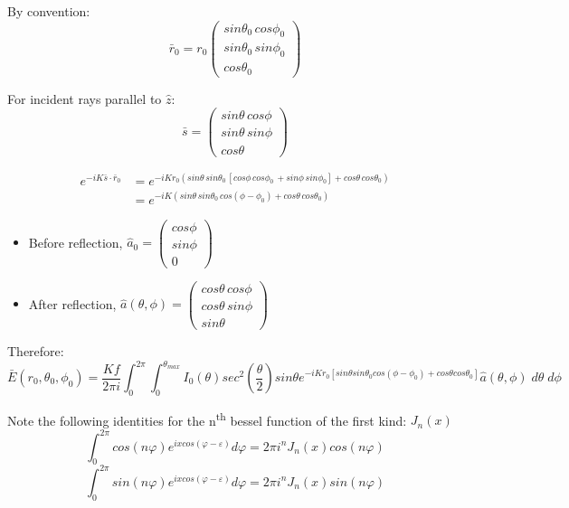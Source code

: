\documentclass{article}
\begin{document}
    By convention: \[ \bar{r}_0 = r_0 \begin{pmatrix} sin\theta_0 \, cos\phi_0 \\ sin\theta_0 \, sin\phi_0 \\ cos\theta_0\end{pmatrix}\]

    For incident rays parallel to \(\hat{z}\): \[\bar{s} = \begin{pmatrix} sin\theta \, cos\phi \\ sin\theta \, sin\phi \\ cos\theta\end{pmatrix} \]

    \begin{align*}
    e^{-iK\bar{s}\cdot\bar{r}_0} & = e^{-i K r_0 (sin\theta \, sin\theta_0 \, [cos\phi\, cos\phi_0\, + sin\phi\, sin\phi_0] + cos\theta\, cos\theta_0)}\\ & = e^{-iK(sin\theta\, sin\theta_0\,cos(\phi-\phi_0)+cos\theta\,cos\theta_0)}
    \end{align*}
    \begin{itemize}
        \item Before reflection, \(\hat{a}_0 = \begin{pmatrix} cos\phi \\ sin\phi \\ 0 \end{pmatrix}\)
        \item After reflection, \(\hat{a}(\theta,\phi) = \begin{pmatrix} cos\theta\, cos\phi \\ cos\theta\, sin\phi \\ sin\theta \end{pmatrix}\)
    \end{itemize}
    
    Therefore:
    \[\bar{E}(r_0, \theta_0,\phi_0) = \frac{Kf}{2\pi i}\int_0^{2\pi} \int_0^{\theta_{max}}I_0(\theta)sec^2\left(\frac{\theta}{2}\right)sin\theta e^{-iKr_0[sin\theta sin\theta_0 cos(\phi - \phi_0) + cos\theta cos\theta_0]} \hat{a}(\theta,\phi) \; d\theta \; d\phi\]
    
    Note the following identities for the n\textsuperscript{th} bessel function of the first kind: \(J_n(x)\)
    \[\int_0^{2\pi} cos(n\varphi)e^{ixcos(\varphi-\varepsilon)}d\varphi = 2\pi i^n J_n(x) cos(n\varphi)\]
    \[\int_0^{2\pi} sin(n\varphi)e^{ixcos(\varphi-\varepsilon)}d\varphi = 2\pi i^n J_n(x) sin(n\varphi)\]
    
\end{document}
